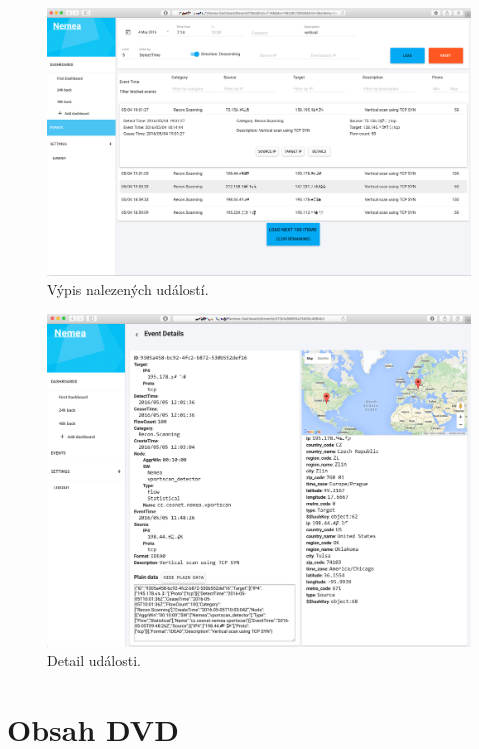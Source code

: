 \begin{figure}[ht]
    \centering
    \includegraphics[width=1\textwidth]{fig/screen_after_2.png}
    \caption{Výpis nalezených událostí.} \label{screen:after:2}
\end{figure}

\begin{figure}[ht]
    \centering
    \includegraphics[width=1\textwidth]{fig/screen_after_3.png}
    \caption{Detail události.} \label{screen:after:3}
\end{figure}



\chapter{Obsah DVD}


